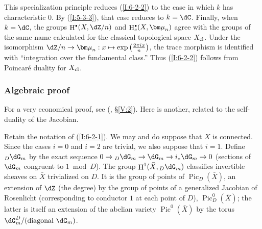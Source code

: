 \documentclass[12pt,oneside,english]{smfbook}
\DeclareMathOperator{\h}{H}
\DeclareMathOperator{\pic}{Pic}
\newcommand{\dmu}{{\bm\mu}}
\newcounter{char}
\let\oldbullet\bullet
\renewcommand{\bullet}{\textnormal{\tiny$\oldbullet$}}
\begin{document}
This specialization principle reduces (\ref{I:6-2-2}) to the case in which $k$ has characteristic $0$. By (\ref{I:5-3-3}), that case reduces to $k=\dC$. Finally, when $k=\dC$, the groups $\h^\bullet(X,\dZ/n)$ and $\h_c^\bullet(X,\dmu_n)$ agree with the groups of the same name calculated for the classical topological space $X_{\textnormal{cl}}$. Under the isomorphism $\dZ/n\to\dmu_n:x\mapsto\exp\left(\frac{2\pi ix}{n}\right)$, the trace morphism is identified with ``integration over the fundamental class.'' Thus (\ref{I:6-2-2}) follows from Poincaré duality for $X_{\textnormal{cl}}$.

\subsubsection{Algebraic proof}\label{I:6-2-3}

For a very economical proof, see (, \S\ref{V:2}).
Here is another, related to the self-duality of the Jacobian.

Retain the notation of (\ref{I:6-2-1}). We may and do suppose that $X$ is connected. Since the cases $i=0$ and $i=2$ are trivial, we also suppose that $i=1$. Define $_D\dG_m$ by the exact sequence $0\to{}_D\dG_m\to\dG_m\to i_*\dG_m\to0$ (sections of $\dG_m$ congruent to $1\bmod D$). The group $\h^1(\bar X,{}_D\dG_m)$ classifies invertible sheaves on $\bar X$ trivialized on $D$. It is the group of points of $\pic_D(\bar X)$, an extension of $\dZ$ (the degree) by the group of points of a generalized Jacobian of Rosenlicht (corresponding to conductor $1$ at each point of $D$), $\pic_D^0(\bar X)$; the latter is itself an extension of the abelian variety $\pic^0(\bar X)$ by the torus $\dG_m^D/(\text{diagonal $\dG_m$})$.
\end{document}
